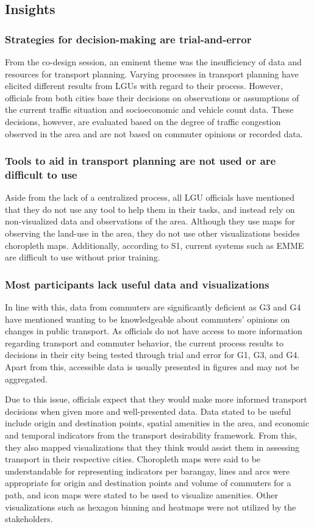 \documentclass{sigchi}
\begin{document}
\subsection{Insights}
\subsubsection{Strategies for decision-making are trial-and-error}
From the co-design session, an eminent theme was the insufficiency of data and resources for transport planning. Varying processes in transport planning have elicited different results from LGUs with regard to their process. However, officials from both cities base their decisions on observations or assumptions of the current traffic situation and socioeconomic and vehicle count data. These decisions, however, are evaluated based on the degree of traffic congestion observed in the area and are not based on commuter opinions or recorded data. 

\subsubsection{Tools to aid in transport planning are not used or are difficult to use}
Aside from the lack of a centralized process, all LGU officials have mentioned that they do not use any tool to help them in their tasks, and instead rely on non-visualized data and observations of the area. Although they use maps for observing the land-use in the area, they do not use other visualizations besides choropleth maps. Additionally, according to S1, current systems such as EMME are difficult to use without prior training.  

\subsubsection{Most participants lack useful data and visualizations}
In line with this, data from commuters are significantly deficient as G3 and G4 have mentioned wanting to be knowledgeable about commuters' opinions on changes in public transport. As officials do not have access to more information regarding transport and commuter behavior, the current process results to decisions in their city being tested through trial and error for G1, G3, and G4. Apart from this, accessible data is usually presented in figures and may not be aggregated.

Due to this issue, officials expect that they would make more informed transport decisions when given more and well-presented data. Data stated to be useful include origin and destination points, spatial amenities in the area, and economic and temporal indicators from the transport desirability framework. From this, they also mapped visualizations that they think would assist them in assessing transport in their respective cities. Choropleth maps were said to be understandable for representing indicators per barangay, lines and arcs were appropriate for origin and destination points and volume of commuters for a path, and icon maps were stated to be used to visualize amenities. Other visualizations such as hexagon binning and heatmaps were not utilized by the stakeholders.
\end{document}
